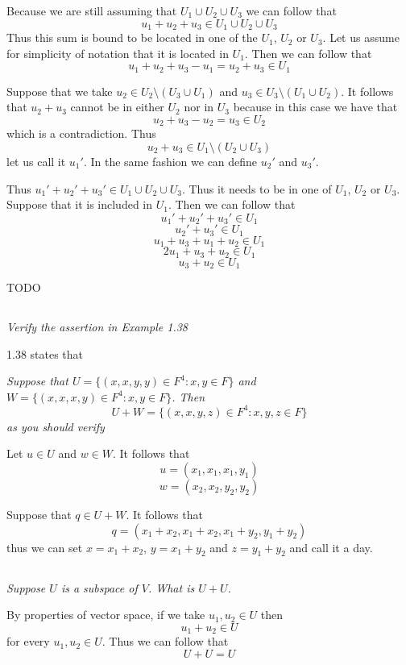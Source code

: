 \documentclass[11pt,oneside,titlepage]{book}
\begin{document}
Because we are still assuming that $U_1 \cup U_2 \cup U_3$ we can follow that
$$u_1 + u_2 + u_3 \in U_1 \cup U_2 \cup U_3$$
Thus this sum is bound to be located in one of the $U_1$, $U_2$ or $U_3$.
Let us assume for simplicity of notation that it is located in $U_1$. Then
we can follow that
$$u_1 + u_2 + u_3 - u_1 = u_2 + u_3 \in U_1$$

Suppose that we take $u_2 \in U_2 \setminus (U_3 \cup U_1)$ and
$u_3 \in U_3 \setminus (U_1 \cup U_2)$. It follows that
$u_2 + u_3$ cannot be in either $U_2$ nor in $U_3$ because in this
case we have that
$$u_2 + u_3 - u_2 = u_3 \in U_2$$
which is a contradiction. Thus
$$u_2 + u_3 \in U_1 \setminus (U_2 \cup U_3)$$
let us call it $u_1'$. In the same fashion we can define $u_2'$ and $u_3'$.

Thus $u_1' + u_2' + u_3' \in U_1 \cup U_2 \cup U_3$. Thus it needs to
be in one of $U_1$, $U_2$ or $U_3$. Suppose that it is included in
$U_1$. Then we can follow that
$$u_1' + u_2' + u_3' \in U_1$$
$$u_2' + u_3' \in U_1$$
$$u_1 + u_3 + u_1 + u_2 \in U_1$$
$$2u_1 + u_3  + u_2 \in U_1$$
$$u_3  + u_2 \in U_1$$

TODO

\subsection{}
\textit{Verify the assertion in Example 1.38}

1.38 states that

\textit{Suppose that $U = \{(x, x, y, y) \in F^4: x, y \in F\}$ and
  $W = \{(x, x, x, y) \in F^4: x, y \in F\}$. Then }
$$U + W = \{(x, x, y, z) \in F^4: x, y, z \in F\}$$
\textit{as you should verify}

Let $u \in U$ and $w \in W$. It follows that
$$u = (x_1, x_1, x_1, y_1)$$
$$w = (x_2, x_2, y_2, y_2)$$

Suppose that $q \in U + W$.
It follows that
$$q = (x_1 + x_2, x_1 + x_2, x_1 + y_2, y_1 + y_2)$$
thus we can set $x = x_1 + x_2$, $y = x_1 + y_2$ and $z = y_1 + y_2$
and call it a day.

\subsection{}
\textit{Suppose $U$ is a subspace of $V$. What is $U + U$.}

By properties of vector space, if we take $u_1, u_2 \in U$ then
$$u_1 + u_2 \in U$$
for every $u_1, u_2 \in U$. Thus we can follow that
$$U + U = U$$
\end{document}
